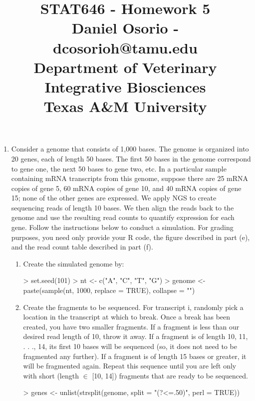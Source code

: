 \documentclass[12pt,a4paper]{paper}
\begin{document}
\title{STAT646 - Homework 5\\\small{Daniel Osorio - dcosorioh@tamu.edu\\Department of Veterinary Integrative Biosciences\\Texas A\&M University}}
\maketitle

\begin{enumerate}
\item Consider a genome that consists of 1,000 bases. The genome is organized into 20 genes, each
of length 50 bases. The first 50 bases in the genome correspond to gene one, the next 50
bases to gene two, etc. In a particular sample containing mRNA transcripts from this genome,
suppose there are 25 mRNA copies of gene 5, 60 mRNA copies of gene 10, and 40 mRNA
copies of gene 15; none of the other genes are expressed. We apply NGS to create sequencing
reads of length 10 bases. We then align the reads back to the genome and use the resulting
read counts to quantify expression for each gene. Follow the instructions below to conduct a
simulation. For grading purposes, you need only provide your R code, the figure described in
part (e), and the read count table described in part (f).
\begin{enumerate}
\item Create the simulated genome by:
\begin{Schunk}
\begin{Sinput}
> set.seed(101)
> nt <- c("A", "C", "T", "G")
> genome <- paste(sample(nt, 1000, replace = TRUE), collapse = "")
\end{Sinput}
\end{Schunk}
\item Create the fragments to be sequenced. For transcript i, randomly pick a location in
the transcript at which to break. Once a break has been created, you have two smaller
fragments. If a fragment is less than our desired read length of 10, throw it away. If a
fragment is of length 10, 11, . . ., 14, its first 10 bases will be sequenced (so, it does not
need to be fragmented any further). If a fragment is of length 15 bases or greater, it will
be fragmented again. Repeat this sequence until you are left only with short (length $\in$
[10, 14]) fragments that are ready to be sequenced.
\begin{Schunk}
\begin{Sinput}
> genes <- unlist(strsplit(genome, split = "(?<=.{50})", perl = TRUE))

\end{Sinput}
\end{Schunk}
\end{enumerate}
\end{enumerate}
\end{document}
